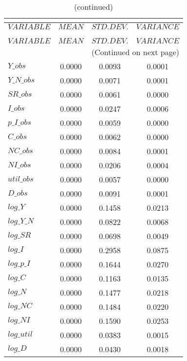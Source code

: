  
\begin{center}
\begin{longtable}{lccc} 
\caption{THEORETICAL MOMENTS}\\
 \label{Table:th_moments}\\
\toprule 
$VARIABLE   $	 & 	 $         MEAN$	 & 	 $    STD. DEV.$	 & 	 $     VARIANCE$\\
\midrule \endfirsthead 
\caption{(continued)}\\
 \toprule \\ 
$VARIABLE   $	 & 	 $         MEAN$	 & 	 $    STD. DEV.$	 & 	 $     VARIANCE$\\
\midrule \endhead 
\midrule \multicolumn{4}{r}{(Continued on next page)} \\ \bottomrule \endfoot 
\bottomrule \endlastfoot 
$Y\_obs     $	 & 	       0.0000	 & 	       0.0093	 & 	       0.0001 \\ 
$Y\_N\_obs  $	 & 	       0.0000	 & 	       0.0071	 & 	       0.0001 \\ 
$SR\_obs    $	 & 	       0.0000	 & 	       0.0061	 & 	       0.0000 \\ 
$I\_obs     $	 & 	       0.0000	 & 	       0.0247	 & 	       0.0006 \\ 
$p\_I\_obs  $	 & 	       0.0000	 & 	       0.0059	 & 	       0.0000 \\ 
$C\_obs     $	 & 	       0.0000	 & 	       0.0062	 & 	       0.0000 \\ 
$NC\_obs    $	 & 	       0.0000	 & 	       0.0084	 & 	       0.0001 \\ 
$NI\_obs    $	 & 	       0.0000	 & 	       0.0206	 & 	       0.0004 \\ 
$util\_obs  $	 & 	       0.0000	 & 	       0.0057	 & 	       0.0000 \\ 
$D\_obs     $	 & 	       0.0000	 & 	       0.0091	 & 	       0.0001 \\ 
$log\_Y     $	 & 	       0.0000	 & 	       0.1458	 & 	       0.0213 \\ 
$log\_Y\_N  $	 & 	       0.0000	 & 	       0.0822	 & 	       0.0068 \\ 
$log\_SR    $	 & 	       0.0000	 & 	       0.0698	 & 	       0.0049 \\ 
$log\_I     $	 & 	       0.0000	 & 	       0.2958	 & 	       0.0875 \\ 
$log\_p\_I  $	 & 	       0.0000	 & 	       0.1644	 & 	       0.0270 \\ 
$log\_C     $	 & 	       0.0000	 & 	       0.1163	 & 	       0.0135 \\ 
$log\_N     $	 & 	       0.0000	 & 	       0.1477	 & 	       0.0218 \\ 
$log\_NC    $	 & 	       0.0000	 & 	       0.1484	 & 	       0.0220 \\ 
$log\_NI    $	 & 	       0.0000	 & 	       0.1590	 & 	       0.0253 \\ 
$log\_util  $	 & 	       0.0000	 & 	       0.0383	 & 	       0.0015 \\ 
$log\_D     $	 & 	       0.0000	 & 	       0.0430	 & 	       0.0018 \\ 
\end{longtable}
 \end{center}
